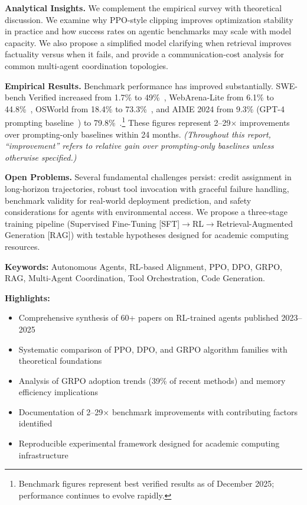 \documentclass[12pt,a4paper]{report}
\theoremstyle{definition}
\begin{document}
\textbf{Analytical Insights.} We complement the empirical survey with theoretical discussion. We examine why PPO-style clipping improves optimization stability in practice and how success rates on agentic benchmarks may scale with model capacity. We also propose a simplified model clarifying when retrieval improves factuality versus when it fails, and provide a communication-cost analysis for common multi-agent coordination topologies.

\textbf{Empirical Results.} Benchmark performance has improved substantially. SWE-bench Verified increased from 1.7\% to 49\%~\cite{jimenez2024swebench}, WebArena-Lite from 6.1\% to 44.8\%~\cite{zhou2024webarena}, OSWorld from 18.4\% to 73.3\%~\cite{xie2024osworld}, and AIME 2024 from 9.3\% (GPT-4 prompting baseline~\cite{openai2024gpt4turbo}) to 79.8\%~\cite{deepseek2025r1}.\footnote{Benchmark figures represent best verified results as of December 2025; performance continues to evolve rapidly.} These figures represent 2--29$\times$ improvements over prompting-only baselines within 24 months. \emph{(Throughout this report, ``improvement'' refers to relative gain over prompting-only baselines unless otherwise specified.)}

\textbf{Open Problems.} Several fundamental challenges persist: credit assignment in long-horizon trajectories, robust tool invocation with graceful failure handling, benchmark validity for real-world deployment prediction, and safety considerations for agents with environmental access. We propose a three-stage training pipeline (Supervised Fine-Tuning [SFT]$\rightarrow$RL$\rightarrow$Retrieval-Augmented Generation [RAG]) with testable hypotheses designed for academic computing resources.

\vspace{0.6cm}
\noindent \textbf{Keywords:} Autonomous Agents, RL-based Alignment, PPO, DPO, GRPO, RAG, Multi-Agent Coordination, Tool Orchestration, Code Generation.

\vspace{0.4cm}
\noindent \textbf{Highlights:}
\begin{itemize}
    \item Comprehensive synthesis of 60+ papers on RL-trained agents published 2023--2025
    \item Systematic comparison of PPO, DPO, and GRPO algorithm families with theoretical foundations
    \item Analysis of GRPO adoption trends (39\% of recent methods) and memory efficiency implications
    \item Documentation of 2--29$\times$ benchmark improvements with contributing factors identified
    \item Reproducible experimental framework designed for academic computing infrastructure
\end{itemize}
\end{document}
